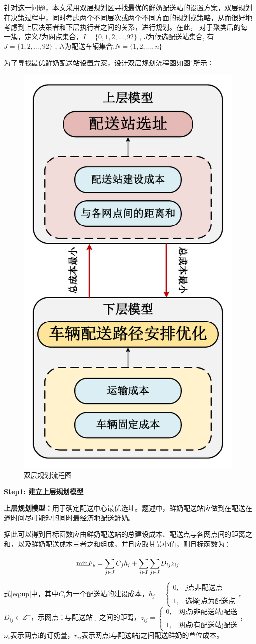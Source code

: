 \documentclass[withoutpreface,bwprint]{cumcmthesis} %
\begin{document}
	针对这一问题，本文采用双层规划区寻找最优的鲜奶配送站的设置方案，双层规划在决策过程中，同时考虑两个不同层次或两个不同方面的规划或策略，从而很好地考虑到上层决策者和下层执行者之间的关系，进行规划。在此， 对于聚类后的每一簇，定义$I$为网点集合，$I=\{0,1,2, ... ,92\}$ , $J$为候选配送站集合, 有$J=\{1,2, ... , 92\}$ ,  $N$为配送车辆集合,$N=\{1,2, ... , n\}$
	
	为了寻找最优鲜奶配送站设置方案，设计双层规划流程图如图\ref{fig:双层规划流程图}所示：
	\begin{figure}[htbp]
		\centering
		\includegraphics[width=0.4\linewidth]{framework.pdf}
		\caption{双层规划流程图}
		\label{fig:双层规划流程图}
	\end{figure}

\textbf{Step1: 建立上层规划模型}
	
\textbf{上层规划模型：}用于确定配送中心最优选址。题述中，鲜奶配送站应做到在配送在途时间尽可能短的同时最经济地配送鲜奶。
	
据此可以得到目标函数应由鲜奶配送站的总建设成本、配送点与各网点间的距离之和，以及鲜奶配送成本三者之和组成，并且应取其最小值，则目标函数为：
    
\begin{equation}
	{\rm{min }}{F_u} = \sum\limits_{j \in J}^{} {{C_j}} {h_j} + \sum\limits_{i \in I}^{} {\sum\limits_{j \in J}^{} {{D_{ij}}} } {z_{ij}}
	\label{eq:up}
\end{equation}

式\eqref{eq:up}中，其中${{C}_{j}}$为一个配送站的建设成本，${{h}_{j}}=\left \{{\begin{matrix}0,&j\text{点非配送点}\\&\\1,&\text{选择j点为配送点}\end{matrix}}\right .$，
${{D}_{ij}} \in {{Z}^{+}}$，示网点 i 与配送站 j 之间的距离，${{z}_{ij}}=\left \{{\begin{matrix}0,&\text{网点i非配送站j配送}\\&\\1,&\text{网点i有配送站j配送}\end{matrix}}\right .$，
${{\omega}_{i}}$表示网点i的订奶量，${{r}_{ij}}$表示网点i与配送站j之间配送鲜奶的单位成本。
\end{document}
